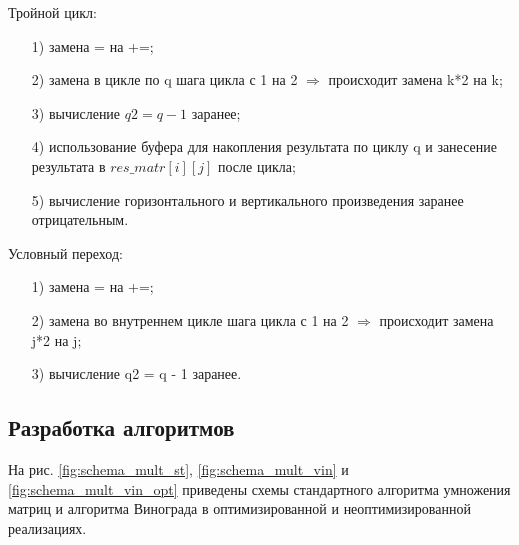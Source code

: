 \documentclass[a4paper,12pt]{article}
\begin{document}
	Тройной цикл:
	\begin{enumerate} 
	\item[1)] замена = на +=;
	\item[2)] замена в цикле по q шага цикла с 1 на 2 $\Rightarrow$ происходит замена k*2 на k;
	\item[3)] вычисление $q2 = q - 1$ заранее;
	\item[4)] использование буфера для накопления результата по циклу q и занесение результата в $res\_matr[i][j]$ после цикла;
	\item[5)] вычисление горизонтального и вертикального произведения заранее отрицательным.

	\end{enumerate}
	
	Условный переход:
	\begin{enumerate} 
	\item[1)] замена = на +=;
	\item[2)] замена во внутреннем цикле шага цикла с 1 на 2 $\Rightarrow$ происходит замена j*2 на j;
	\item[3)] вычисление q2 = q - 1 заранее.
	\end{enumerate}
        
    \subsection{Разработка алгоритмов}
    
        На рис. \ref{fig:schema_mult_st}, \ref{fig:schema_mult_vin} и \ref{fig:schema_mult_vin_opt} приведены схемы стандартного алгоритма умножения матриц и алгоритма Винограда в оптимизированной и неоптимизированной реализациях.
        
\end{document}
